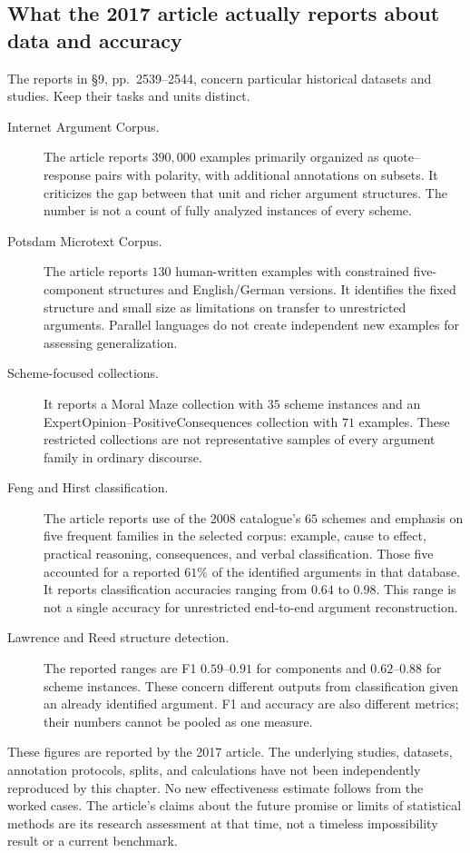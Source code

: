 \subsection{What the 2017 article actually reports about data and accuracy}

The reports in \S9, pp.~2539--2544, concern particular historical
datasets and studies. Keep their tasks and units distinct.

\begin{description}
\item[Internet Argument Corpus.]
The article reports \(390{,}000\) examples primarily organized
as quote--response pairs with polarity, with additional annotations
on subsets. It criticizes the gap between that unit and richer
argument structures. The number is not a count of fully analyzed
instances of every scheme.
\item[Potsdam Microtext Corpus.]
The article reports \(130\) human-written examples with constrained
five-component structures and English/German versions. It identifies
the fixed structure and small size as limitations on transfer to
unrestricted arguments. Parallel languages do not create independent
new examples for assessing generalization.
\item[Scheme-focused collections.]
It reports a Moral Maze collection with \(35\) scheme instances
and an ExpertOpinion--PositiveConsequences collection with \(71\)
examples. These restricted collections are not representative samples
of every argument family in ordinary discourse.
\item[Feng and Hirst classification.]
The article reports use of the 2008 catalogue's \(65\) schemes
and emphasis on five frequent families in the selected corpus:
example, cause to effect, practical reasoning, consequences,
and verbal classification. Those five accounted for a reported
\(61\%\) of the identified arguments in that database.
It reports classification accuracies ranging from \(0.64\) to \(0.98\).
This range is not a single accuracy for unrestricted end-to-end
argument reconstruction.
\item[Lawrence and Reed structure detection.]
The reported ranges are F1 \(0.59\)--\(0.91\) for components
and \(0.62\)--\(0.88\) for scheme instances.
These concern different outputs from classification given an
already identified argument. F1 and accuracy are also different
metrics; their numbers cannot be pooled as one measure.
\end{description}

These figures are reported by the 2017 article. The underlying
studies, datasets, annotation protocols, splits, and calculations
have not been independently reproduced by this chapter.
No new effectiveness estimate follows from the worked cases.
The article's claims about the future promise or limits of statistical
methods are its research assessment at that time, not a timeless
impossibility result or a current benchmark.

